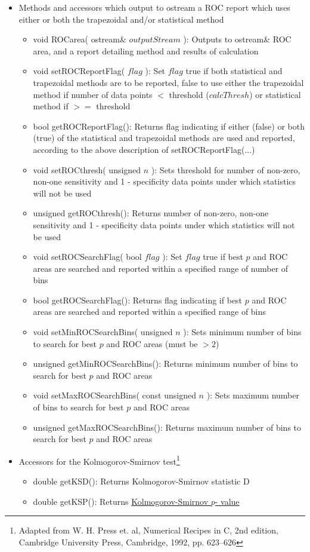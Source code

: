 \documentclass{report}
\begin{document}
\begin{itemize}
\begin{itemize}
\item Methods and accessors which output to ostream a ROC report which
      uses either or both the trapezoidal and/or statistical method
\begin{itemize}
\item void ROCarea( ostream\& $outputStream$ ): Outputs to ostream\&
      ROC area, and a report detailing method and results of
      calculation
\item void setROCReportFlag( $flag$ ): Set $flag$ true if both
      statistical and trapezoidal methods are to be reported, false to
      use either the trapezoidal method if number of data points $<$
      threshold ($calcThresh$) or statistical method if $>=$ threshold
\item bool getROCReportFlag(): Returns flag indicating if either
      (false) or both (true) of the statistical and trapezoidal
      methods
      are used and reported, according to the above description of
      setROCReportFlag($\ldots$)
\item void setROCthresh( unsigned $n$ ): Sets threshold for number of
      non-zero, non-one sensitivity and 1 - specificity data points
      under which statistics will not be used
\item unsigned getROCthresh(): Returns number of non-zero, non-one
      sensitivity and 1 - specificity data points under which
      statistics will not be used
\item void setROCSearchFlag( bool $flag$ ): Set $flag$ true if best
      $p$ and ROC areas are searched and reported within a specified
      range of number of bins
\item bool getROCSearchFlag(): Returns flag indicating if best $p$ and
      ROC areas are searched and reported within a specified range of
      bins
\item void setMinROCSearchBins( unsigned $n$ ): Sets minimum number of
      bins to search for best $p$ and ROC areas (must be $>2$)
\item unsigned getMinROCSearchBins(): Returns minimum number of bins
      to search for best $p$ and ROC areas
\item void setMaxROCSearchBins( const unsigned $n$ ): Sets maximum
      number of bins to search for best $p$ and ROC areas
\item unsigned getMaxROCSearchBins(): Returns maximum number of bins
      to search for best $p$ and ROC areas
\end{itemize}

\item Accessors for the Kolmogorov-Smirnov test\footnote{Adapted from
      W. H. Press et. al, Numerical Recipes in C, 2nd edition,
      Cambridge
      University Press, Cambridge, 1992, pp. 623--626}
\begin{itemize}
\item double getKSD(): Returns Kolmogorov-Smirnov statistic D
\item double getKSP(): Returns \hyperref[ks_p]{Kolmogorov-Smirnov $p$-
value}
\end{itemize}


\end{itemize}
\end{itemize}
\end{document}
